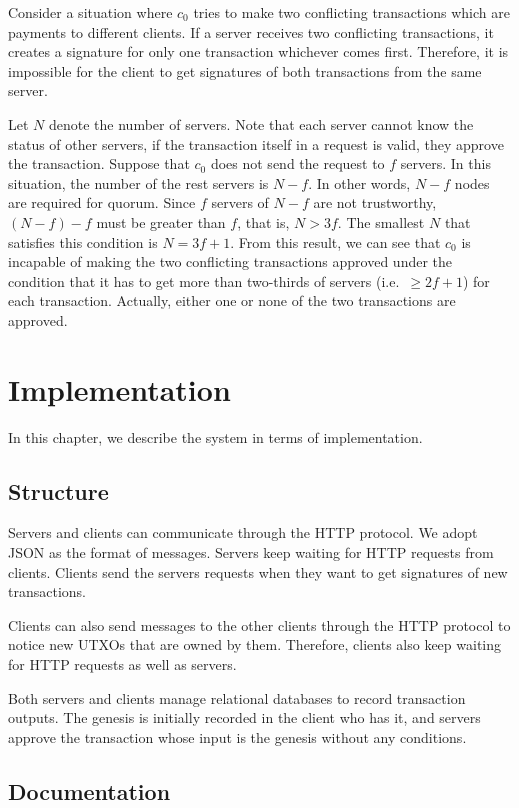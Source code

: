 \documentclass[a4paper, oneside]{discothesis}
\begin{document}
Consider a situation where $c_0$ tries to make two conflicting transactions
which are payments to different clients.
If a server receives two conflicting transactions,
it creates a signature for only one transaction whichever comes first.
Therefore, it is impossible for the client to get signatures of both transactions
from the same server.

Let $N$ denote the number of servers.
Note that each server cannot know the status of other servers,
if the transaction itself in a request is valid, they approve the transaction.
Suppose that $c_0$ does not send the request to $f$ servers.
In this situation, the number of the rest servers is $N-f$.
In other words, $N-f$ nodes are required for quorum.
Since $f$ servers of $N-f$ are not trustworthy, $(N-f)-f$ must be greater than $f$,
that is, $N > 3f$.
The smallest $N$ that satisfies this condition is $N=3f+1$.
From this result, we can see that $c_0$ is incapable of making the two conflicting transactions
approved under the condition that it has to get more than two-thirds of servers
(i.e.\ $\geq2f+1$) for each transaction.
Actually, either one or none of the two transactions are approved.

\chapter{Implementation}
In this chapter, we describe the system in terms of implementation.

\section{Structure}
Servers and clients can communicate through the HTTP protocol.
We adopt JSON as the format of messages.
Servers keep waiting for HTTP requests from clients.
Clients send the servers requests when they want to get signatures of new transactions.

Clients can also send messages to the other clients through the HTTP protocol
to notice new UTXOs that are owned by them.
Therefore, clients also keep waiting for HTTP requests as well as servers.

Both servers and clients manage relational databases to record transaction outputs.
The genesis is initially recorded in the client who has it,
and servers approve the transaction whose input is the genesis without any conditions.



\section{Documentation}
\end{document}
